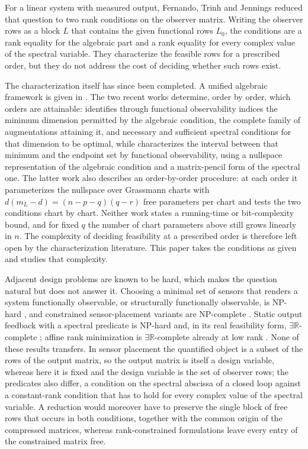 \documentclass[journal]{IEEEtran}
\theoremstyle{plainn}
\theoremstyle{remark}
\begin{document}
For a linear system with measured output, Fernando, Trinh and Jennings \cite{fer10}
reduced that question to two rank conditions on the observer matrix. Writing the observer
rows as a block $L$ that contains the given functional rows $L_0$, the conditions are a
rank equality for the algebraic part and a rank equality for every complex value of the
spectral variable. They characterize the feasible rows for a prescribed order, but they do
not address the cost of deciding whether such rows exist.

The characterization itself has since been completed. A unified algebraic framework is
given in \cite{dar25}. The two recent works \cite{fer26a,fer26b} determine, order by order,
which orders are attainable: \cite{fer26a} identifies through functional observability
indices the minimum dimension permitted by the algebraic condition, the complete family of
augmentations attaining it, and necessary and sufficient spectral conditions for that
dimension to be optimal, while \cite{fer26b} characterizes the interval between that
minimum and the endpoint set by functional observability, using a nullspace representation
of the algebraic condition and a matrix-pencil form of the spectral one. The latter work
also describes an order-by-order procedure: at each order it parameterizes the nullspace
over Grassmann charts with $d(m_L-d)=(n-p-q)(q-r)$ free parameters per chart and tests the
two conditions chart by chart. Neither work states a running-time or bit-complexity bound,
and for fixed $q$ the number of chart parameters above still grows linearly in $n$. The
complexity of deciding feasibility at a prescribed order is therefore left open by the
characterization literature. This paper takes the conditions as given and studies that
complexity.

Adjacent design problems are known to be hard, which makes the question natural but does
not answer it. Choosing a minimal set of sensors that renders a system functionally
observable, or structurally functionally observable, is NP-hard \cite{zha25}, and
constrained sensor-placement variants are NP-complete \cite{dey21}. Static output feedback
with a spectral predicate is NP-hard \cite{lof26,bar26} and, in its real feasibility form,
$\exists\mathbb R$-complete \cite{liu26}; affine rank minimization is
$\exists\mathbb R$-complete already at low rank \cite{maj26}. None of these results
transfers. In sensor placement the quantified object is a subset of the rows of the output
matrix, so the output matrix is itself a design variable, whereas here it is fixed and the
design variable is the set of observer rows; the predicates also differ, a condition on the
spectral abscissa of a closed loop against a constant-rank condition that has to hold for
every complex value of the spectral variable. A reduction would moreover have to preserve
the single block of free rows that occurs in both conditions, together with the common
origin of the compressed matrices, whereas rank-constrained formulations leave every entry
of the constrained matrix free.
\end{document}
